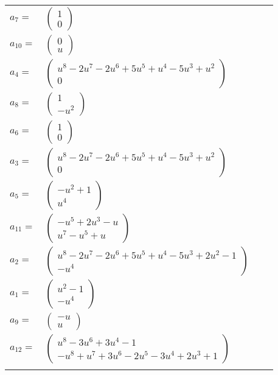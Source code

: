 \documentclass[1p]{elsarticle_modified}
\theoremstyle{definition}
\begin{document}
\begin{tabular}{m{7pt} m{180pt} m{7pt} m{180pt} }
\flushright $a_{7}=$&$\begin{pmatrix}1\\0\end{pmatrix}$ \\
\flushright $a_{10}=$&$\begin{pmatrix}0\\u\end{pmatrix}$ \\
\flushright $a_{4}=$&$\begin{pmatrix}u^8-2 u^7-2 u^6+5 u^5+u^4-5 u^3+u^2\\0\end{pmatrix}$ \\
\flushright $a_{8}=$&$\begin{pmatrix}1\\- u^2\end{pmatrix}$ \\
\flushright $a_{6}=$&$\begin{pmatrix}1\\0\end{pmatrix}$ \\
\flushright $a_{3}=$&$\begin{pmatrix}u^8-2 u^7-2 u^6+5 u^5+u^4-5 u^3+u^2\\0\end{pmatrix}$ \\
\flushright $a_{5}=$&$\begin{pmatrix}- u^2+1\\u^4\end{pmatrix}$ \\
\flushright $a_{11}=$&$\begin{pmatrix}- u^5+2 u^3- u\\u^7- u^5+u\end{pmatrix}$ \\
\flushright $a_{2}=$&$\begin{pmatrix}u^8-2 u^7-2 u^6+5 u^5+u^4-5 u^3+2 u^2-1\\- u^4\end{pmatrix}$ \\
\flushright $a_{1}=$&$\begin{pmatrix}u^2-1\\- u^4\end{pmatrix}$ \\
\flushright $a_{9}=$&$\begin{pmatrix}- u\\u\end{pmatrix}$ \\
\flushright $a_{12}=$&$\begin{pmatrix}u^8-3 u^6+3 u^4-1\\- u^8+u^7+3 u^6-2 u^5-3 u^4+2 u^3+1\end{pmatrix}$\\&\end{tabular}
\end{document}
